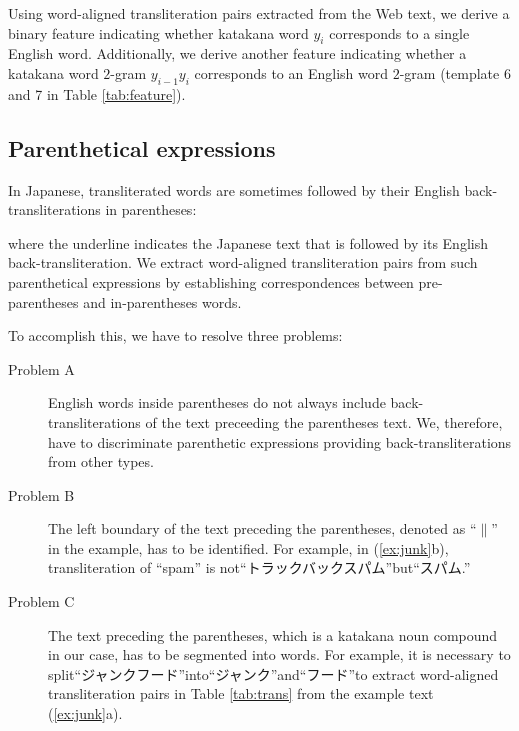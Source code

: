 \documentclass[english]{jnlp_1.4_rep}
\begin{document}
Using word-aligned transliteration pairs extracted from the Web text, we
derive a binary feature indicating whether katakana word $y_i$
corresponds to a single English word. Additionally, we derive another
feature indicating whether a katakana word $2$-gram $y_{i-1}y_{i}$
corresponds to an English word $2$-gram (template 6 and 7 in Table
\ref{tab:feature}).


\subsection{Parenthetical expressions}

In Japanese, transliterated words are sometimes followed by their
English back-transliterations in parentheses:

\begin{lingexample}
\end{lingexample}

\noindent
where the underline indicates the Japanese text that is followed by its
English back-transliteration. We extract word-aligned transliteration
pairs from such parenthetical expressions by establishing
correspondences between pre-parentheses and in-parentheses words.

To accomplish this, we have to resolve three problems:
\begin{description}
 \item[Problem A]
	    English words inside parentheses do not always include
	    back-transliterations of the text preceeding the parentheses
	    text. We, therefore, have to discriminate parenthetic
	    expressions providing back-transliterations from other types.
 \item[Problem B]
	    The left boundary of the text preceding the parentheses,
	    denoted as ``$\|$'' in the example, has to be identified.
	    For example, in (\ref{ex:junk}b), transliteration of ``spam''
	    is not“トラックバックスパム”but“スパム.”
 \item[Problem C]
	    The text preceding the parentheses, which is a katakana noun
	    compound in our case, has to be segmented into words. For
	    example, it is necessary to split“ジャンクフード”into“ジャンク”and“フード”to extract word-aligned
	    transliteration pairs in Table \ref{tab:trans} from the
	    example text (\ref{ex:junk}a).
\end{description}
\end{document}
